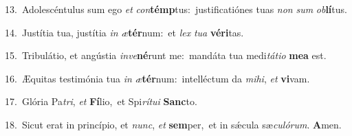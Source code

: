 {\numbfont\textcolor{\numbcolor}{13.}}~Adolescéntulus sum ego \textit{et} \textit{con}\-\textbf{témp}tus:~\star justificatiónes tuas \textit{non} \textit{sum} \textit{ob}\-\textbf{lí}tus.\par
{\numbfont\textcolor{\numbcolor}{14.}}~Justítia tua, justítia \textit{in} \textit{æ}\-\textbf{tér}num:~\star et \textit{lex} \textit{tu}\-\textit{a} \textbf{vé}\-\textbf{ri}tas.\par
{\numbfont\textcolor{\numbcolor}{15.}}~Tribulátio, et angústia \textit{in}\-\textit{ve}\textbf{né}runt me:~\star mandáta tua medi\-\textit{tá}\-\textit{ti}\textit{o} \textbf{me}\-\textbf{a} est.\par
{\numbfont\textcolor{\numbcolor}{16.}}~Æquitas testimónia tua \textit{in} \textit{æ}\-\textbf{tér}num:~\star intelléctum da \textit{mi}\-\textit{hi}, \textit{et} \textbf{vi}\-vam.\par
{\numbfont\textcolor{\numbcolor}{17.}}~Glória Pa\-\textit{tri}\-, \textit{et} \textbf{Fí}\-lio,~\star et Spi\-\textit{rí}\-\textit{tu}\textit{i} \textbf{Sanc}\-to.\par
{\numbfont\textcolor{\numbcolor}{18.}}~Sicut erat in princípio, et \textit{nunc}\-, \textit{et} \textbf{sem}\-per,~\star et in sǽcula sæ\-\textit{cu}\-\textit{ló}\textit{rum}. \textbf{A}\-men.\par
